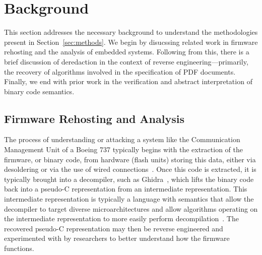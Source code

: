\newenvironment{prettylist}{
	\begin{list}{
		\footnotesize\raisebox{0pt}{\small\ding{121}}
	}{
		\setlength\topsep{2pt plus 1pt minus 1pt}
		\setlength\leftmargin{2em}
		\setlength\rightmargin{0pt}
		\setlength\itemsep{1pt plus.1pt}
		\setlength\parskip{0pt}
		\setlength\parsep{0pt}
		\setlength\itemindent{0pt}
	}
}{
	\end{list}
}



\section{Background}
This section addresses the necessary background to understand the methodologies present in Section~\ref{sec:methods}. 
We begin by disucssing related work in firmware rehosting and the analysis of embedded systems.
Following from this, there is a brief discussion of deredaction in the context of reverse engineering---primarily, the recovery of algorithms involved in the specification of PDF documents.
Finally, we end with prior work in the verification and abstract interpretation of binary code semantics.

\subsection{Firmware Rehosting and Analysis}

The process of understanding or attacking a system like the Communication Management Unit of a Boeing 737 typically begins with the extraction of the firmware, or binary code, from hardware (flash units) storing this data, either via desoldering or via the use of wired connections~\cite{milburn2018there}.
Once this code is extracted, it is typically brought into a decompiler, such as Ghidra~\cite{eagle2020ghidra}, which lifts the binary code back into a pseudo-C representation from an intermediate representation.
This intermediate representation is typically a language with semantics that allow the decompiler to target diverse microarchitectures and allow algorithms operating on the intermediate representation to more easily perform decompilation~\cite{cifuentes1995decompilation}.
The recovered pseudo-C representation may then be reverse engineered and experimented with by researchers to better understand how the firmware functions.

